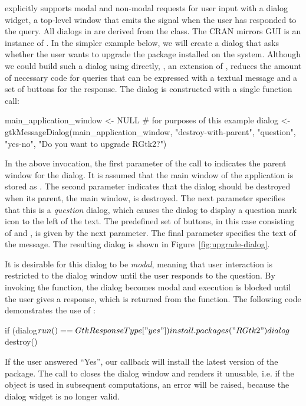 \documentclass[article,shortnames]{jss}
\begin{document}
 explicitly supports modal and non-modal requests for user
input with a dialog widget, a top-level window that emits the
 signal when the user has responded to the query. All
dialogs in  are derived from the  class. The
CRAN mirrors GUI is an instance of . In the simpler
example below,
we will create a dialog that asks whether the user wants to upgrade
the  package installed on the system. Although we could
build such a dialog using  directly,
, an extension of , reduces the
amount of necessary code
for queries that can be expressed with a textual message and a
set of buttons for the response. The dialog is constructed with a
single function call:
\begin{Code}
main_application_window <- NULL # for purposes of this example
dialog <- gtkMessageDialog(main_application_window,  
                           "destroy-with-parent", "question",
                           "yes-no", "Do you want to upgrade RGtk2?")
\end{Code}
In the above invocation, the first parameter of the call to 
 indicates the parent window for the dialog. It
is assumed that the main window of the application is stored as
. The second parameter indicates that
the dialog should be destroyed when its parent, the main window, is
destroyed.  The next parameter specifies that this is a
\emph{question} dialog, which causes the dialog to display a question
mark icon to the left of the text.  The predefined set of buttons, in
this case consisting of  and , is given by the next
parameter. The final parameter specifies the text of the message.  The
resulting dialog is shown in Figure~\ref{fig:upgrade-dialog}.

It is desirable for this dialog to be \emph{modal}, meaning that user
interaction
is restricted to the dialog window until the user responds to the
question. By invoking the  function, the dialog
becomes modal and execution is blocked until the user gives a
response, which is returned from the function. The following code
demonstrates the use of :
\begin{Code}
if (dialog$run() == GtkResponseType["yes"])
 install.packages("RGtk2")
dialog$destroy()
\end{Code}
If the user answered
``Yes'', our callback will install the latest version of the
 package. The call to  closes the
dialog window and renders it unusable, i.e. if the object is used in
subsequent computations, an error will be raised, because the dialog
widget is no longer valid.
\end{document}
